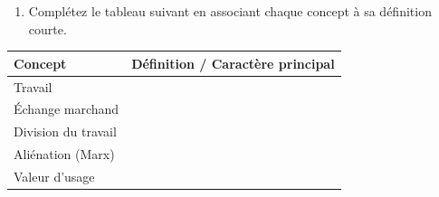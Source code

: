 \documentclass[11pt]{article}
\begin{document}
\begin{exercice}
\begin{enumerate}
    \item Complétez le tableau suivant en associant chaque concept à sa définition courte.
\end{enumerate}
\begin{tabularx}{\linewidth}{|X|X|}
\hline
\textbf{Concept} & \textbf{Définition / Caractère principal} \\
\hline
Travail & \\
\hline
Échange marchand & \\
\hline
Division du travail & \\
\hline
Aliénation (Marx) & \\
\hline
Valeur d'usage & \\
\hline
\end{tabularx}
\end{exercice}
\end{document}
